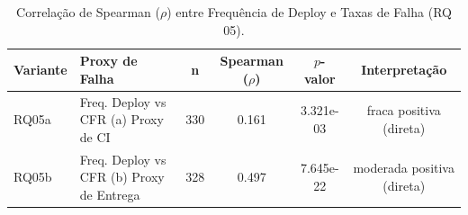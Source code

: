 \begin{table}[ht]
\centering
\caption{Correlação de Spearman ($\rho$) entre Frequência de Deploy e Taxas de Falha (RQ 05).}
\label{tab:rq05_spearman}
\small
\begin{tabular}{llcccc}
\toprule
\textbf{Variante} & \textbf{Proxy de Falha} & \textbf{n} & \textbf{Spearman ($\rho$)} & \textbf{$p$-valor} & \textbf{Interpretação} \\
\midrule
RQ05a & Freq. Deploy vs CFR (a) Proxy de CI & 330 & 0.161 & 3.321e-03 & fraca positiva (direta) \\
RQ05b & Freq. Deploy vs CFR (b) Proxy de Entrega & 328 & 0.497 & 7.645e-22 & moderada positiva (direta) \\
\bottomrule
\end{tabular}
\end{table}
